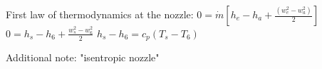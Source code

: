 First law of thermodynamics at the nozzle:  
\( 0 = \dot{m} \left[ h_e - h_a + \frac{(w_e^2 - w_a^2)}{2} \right] \)  
\( 0 = h_s - h_6 + \frac{w_s^2 - w_6^2}{2} \)  
\( h_s - h_6 = c_p (T_s - T_6) \)  

Additional note: "isentropic nozzle"